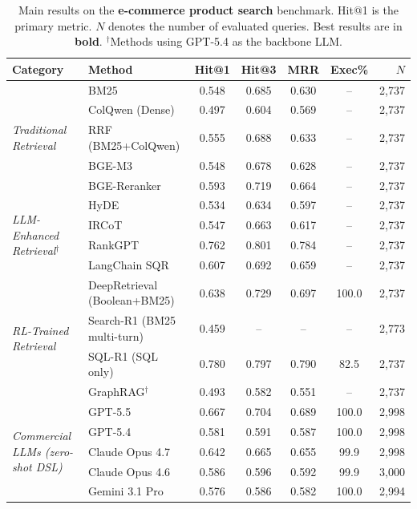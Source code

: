 \begin{table}[t]
\centering
\small
\caption{Main results on the \textbf{e-commerce product search} benchmark. Hit@1 is the primary metric. $N$ denotes the number of evaluated queries. Best results are in \textbf{bold}. $^\dagger$Methods using GPT-5.4 as the backbone LLM.}
\label{tab:main_ecommerce}
\begin{tabular}{llccccr}
\toprule
\textbf{Category} & \textbf{Method} & \textbf{Hit@1} & \textbf{Hit@3} & \textbf{MRR} & \textbf{Exec\%} & \textbf{$N$} \\
\midrule
\multirow{5}{*}{\textit{Traditional Retrieval}}
& BM25 & 0.548 & 0.685 & 0.630 & -- & 2{,}737 \\
& ColQwen (Dense) & 0.497 & 0.604 & 0.569 & -- & 2{,}737 \\
& RRF (BM25+ColQwen) & 0.555 & 0.688 & 0.633 & -- & 2{,}737 \\
& BGE-M3 & 0.548 & 0.678 & 0.628 & -- & 2{,}737 \\
& BGE-Reranker & 0.593 & 0.719 & 0.664 & -- & 2{,}737 \\
\midrule
\multirow{4}{*}{\textit{LLM-Enhanced Retrieval$^\dagger$}}
& HyDE & 0.534 & 0.634 & 0.597 & -- & 2{,}737 \\
& IRCoT & 0.547 & 0.663 & 0.617 & -- & 2{,}737 \\
& RankGPT & 0.762 & 0.801 & 0.784 & -- & 2{,}737 \\
& LangChain SQR & 0.607 & 0.692 & 0.659 & -- & 2{,}737 \\
\midrule
\multirow{4}{*}{\textit{RL-Trained Retrieval}}
& DeepRetrieval (Boolean+BM25) & 0.638 & 0.729 & 0.697 & 100.0 & 2{,}737 \\
& Search-R1 (BM25 multi-turn) & 0.459 & -- & -- & -- & 2{,}773 \\
& SQL-R1 (SQL only) & 0.780 & 0.797 & 0.790 & 82.5 & 2{,}737 \\
& GraphRAG$^\dagger$ & 0.493 & 0.582 & 0.551 & -- & 2{,}737 \\
\midrule
\multirow{5}{*}{\textit{Commercial LLMs (zero-shot DSL)}}
& GPT-5.5 & 0.667 & 0.704 & 0.689 & 100.0 & 2{,}998 \\
& GPT-5.4 & 0.581 & 0.591 & 0.587 & 100.0 & 2{,}998 \\
& Claude Opus 4.7 & 0.642 & 0.665 & 0.655 & 99.9 & 2{,}998 \\
& Claude Opus 4.6 & 0.586 & 0.596 & 0.592 & 99.9 & 3{,}000 \\
& Gemini 3.1 Pro & 0.576 & 0.586 & 0.582 & 100.0 & 2{,}994 \\
\midrule

\end{tabular}
\end{table}
